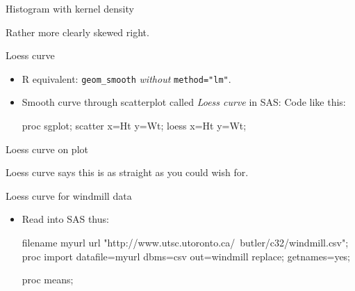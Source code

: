 \documentclass[unknownkeysallowed]{beamer}\usepackage[]{graphicx}\usepackage[]{color}
\begin{document}
\begin{frame}[fragile]{Histogram with kernel density}


Rather more clearly skewed right.  
  
\end{frame}


\begin{frame}[fragile]{Loess curve}

  \begin{itemize}
  \item R equivalent: \texttt{geom\_smooth} \emph{without} \texttt{method="lm"}.
  \item Smooth curve through scatterplot called \emph{Loess curve}  in SAS: Code like this:
\begin{Sascode}[store=mjc]
proc sgplot;
  scatter x=Ht y=Wt;
  loess x=Ht y=Wt;
\end{Sascode}


  \end{itemize}
  
\end{frame}

\begin{frame}[fragile]{Loess curve on plot}
  
  
  Loess curve says this is as straight as you could wish for.
\end{frame}

\begin{frame}[fragile]{Loess curve for windmill data}
  
  \begin{itemize}
  \item Read into SAS thus:
    
  \begin{Datastep}
filename myurl url 
  "http://www.utsc.utoronto.ca/~butler/c32/windmill.csv";    
proc import
  datafile=myurl
    dbms=csv
    out=windmill
    replace;
  getnames=yes;
  \end{Datastep}
  
  \begin{Sascode}[store=ng]
proc means;    
  \end{Sascode}
  
    
  \end{itemize}
  
\end{frame}
\end{document}
